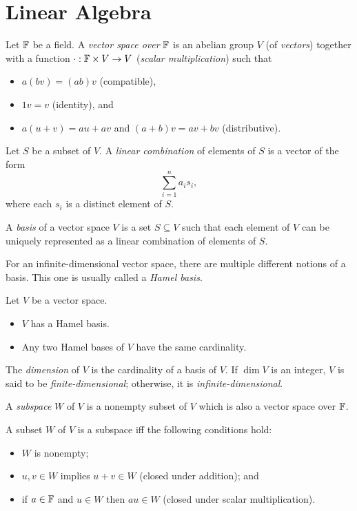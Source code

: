 \section{Linear Algebra}
\begin{defn}
  Let $\mathbb{F}$ be a field. A \emph{vector space over} $\mathbb{F}$ is an abelian group
  $V$ (of \emph{vectors})
  together with a function $\cdot:\mathbb{F}\times V\to V$ (\emph{scalar
    multiplication}) such that
  \begin{itemize}
    \item $a(b v)=(ab) v$ (compatible),
    \item $1 v= v$ (identity), and
    \item $a( u+ v)=a u+a v$ and $(a+b)
      v=a v+b v$ (distributive).
  \end{itemize}
\end{defn}
\begin{defn}
  Let $S$ be a subset of $V$. A \emph{linear combination} of elements of $S$ is
  a vector of the form \[\sum_{i=1}^n a_i s_i,\] where each $s_i$ is a
  distinct element of $S$.

  A \emph{basis} of a vector space $V$ is a set $S\subseteq V$ such that each
  element of $V$ can be uniquely represented as a linear combination of elements
  of $S$.
\end{defn}
\begin{rem}
  For an infinite-dimensional vector space, there are multiple different notions
  of a basis. This one is usually called a \emph{Hamel basis}.
\end{rem}
\begin{thm}
  Let $V$ be a vector space.
  \begin{itemize}
    \item $V$ has a Hamel basis.
    \item Any two Hamel bases of $V$ have the same cardinality.
  \end{itemize}
\end{thm}
\begin{defn}
  The \emph{dimension} of $V$ is the cardinality of a basis of $V$. If $\dim V$
  is an integer, $V$ is said to be \emph{finite-dimensional}; otherwise, it is
  \emph{infinite-dimensional}.
\end{defn}
\begin{defn}
  A \emph{subspace} $W$ of $V$ is a nonempty subset of $V$ which is also a
  vector space over $\mathbb{F}$.
\end{defn}
\begin{prop}
  A subset $W$ of $V$ is a subspace iff the following conditions hold:
  \begin{itemize}
    \item $W$ is nonempty;
    \item $u,v\in W$ implies $u+v\in W$ (closed under addition); and
    \item if $a\in\mathbb{F}$ and $u\in W$ then $au\in W$ (closed under scalar
      multiplication).
  \end{itemize}
\end{prop}
